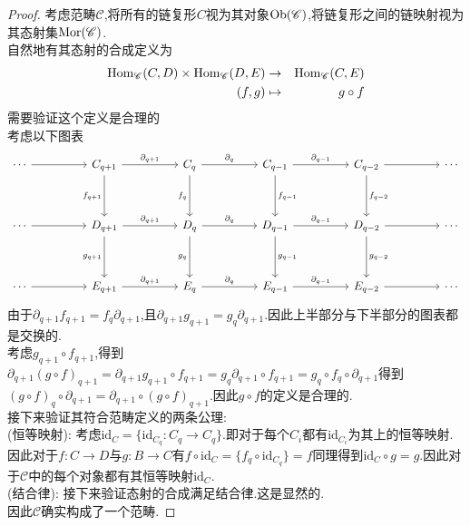 \documentclass{article}
\begin{document}
\begin{proof}
    考虑范畴$\mathscr{C}$,将所有的链复形$C$视为其对象$\operatorname{Ob}(\mathscr{C})$,将链复形之间的链映射视为其态射集$\operatorname{Mor}(\mathscr{C})$.\\
    自然地有其态射的合成定义为
    \begin{eqnarray*}
        \operatorname{Hom}_{\mathscr{C}}(C,D) \times \operatorname{Hom}_{\mathscr{C}}(D,E) &\to& \operatorname{Hom}_{\mathscr{C}}(C,E)\\
        (f,g) &\mapsto& g \circ f
    \end{eqnarray*}
    需要验证这个定义是合理的\\
    考虑以下图表
    \[\begin{tikzcd}
        \cdots && {C_{q+1}} && {C_q} && {C_{q-1}} && {C_{q-2}} && \cdots \\
        \\
        \cdots && {D_{q+1}} && {D_q} && {D_{q-1}} && {D_{q-2}} && \cdots \\
        \\
        \cdots && {E_{q+1}} && {E_q} && {E_{q-1}} && {E_{q-2}} && \cdots
        \arrow[from=1-1, to=1-3]
        \arrow["{\partial_{q+1}}", from=1-3, to=1-5]
        \arrow["{\partial_q}", from=1-5, to=1-7]
        \arrow["{\partial_{q-1}}", from=1-7, to=1-9]
        \arrow[from=1-9, to=1-11]
        \arrow[from=3-1, to=3-3]
        \arrow["{\partial_{q+1}}", from=3-3, to=3-5]
        \arrow["{\partial_q}", from=3-5, to=3-7]
        \arrow["{\partial_{q-1}}", from=3-7, to=3-9]
        \arrow[from=3-9, to=3-11]
        \arrow["{f_{q+1}}"', from=1-3, to=3-3]
        \arrow["{f_q}"', from=1-5, to=3-5]
        \arrow["{f_{q-1}}", from=1-7, to=3-7]
        \arrow["{f_{q-2}}", from=1-9, to=3-9]
        \arrow[from=5-1, to=5-3]
        \arrow["{g_{q+1}}"', from=3-3, to=5-3]
        \arrow["{g_q}"', from=3-5, to=5-5]
        \arrow["{\partial_{q+1}}", from=5-3, to=5-5]
        \arrow["{\partial_{q}}", from=5-5, to=5-7]
        \arrow["{\partial_{q-1}}", from=5-7, to=5-9]
        \arrow["{g_{q-1}}", from=3-7, to=5-7]
        \arrow["{g_{q-2}}", from=3-9, to=5-9]
        \arrow[from=5-9, to=5-11]
    \end{tikzcd}\]
由于$\partial_{q+1} f_{q+1} = f_q\partial_{q+1}$,且$\partial_{q+1} g_{q+1} = g_q\partial_{q+1}$.因此上半部分与下半部分的图表都是交换的.\\
考虑$g_{q+1}\circ f_{q+1}$,得到$\partial_{q+1} (g \circ f)_{q+1} = \partial_{q+1} g_{q+1} \circ f_{q+1} = g_q \partial_{q+1}\circ f_{q+1} = g_q \circ f_q \circ \partial_{q+1}$得到$(g \circ f)_q \circ \partial_{q+1} = \partial_{q+1} \circ (g \circ f)_{q+1}$.因此$g \circ f$的定义是合理的.\\
接下来验证其符合范畴定义的两条公理:\\
(恒等映射): 考虑$\text{id}_C = \{\text{id}_{C_q}: C_q \to C_q\}$.即对于每个$C_i$都有$\text{id}_{C_i}$为其上的恒等映射.因此对于$f : C \to D$与$g : B \to C$有$f \circ \text{id}_C = \{f_q \circ \text{id}_{C_q}\} = f$同理得到$\text{id}_C \circ g = g$.因此对于$\mathscr{C}$中的每个对象都有其恒等映射$\text{id}_C$.\\
(结合律): 接下来验证态射的合成满足结合律.这是显然的.\\
因此$\mathscr{C}$确实构成了一个范畴.
\end{proof}
\end{document}
